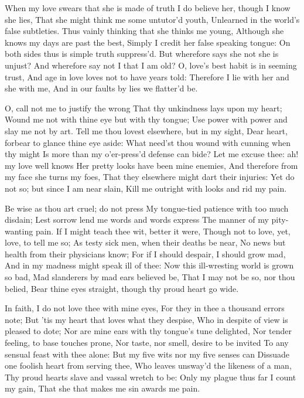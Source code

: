 \documentclass[twocolumn]{book}
\begin{document}
When my love swears that she is made of truth
I do believe her, though I know she lies,
That she might think me some untutor'd youth,
Unlearned in the world's false subtleties.
Thus vainly thinking that she thinks me young,
Although she knows my days are past the best,
Simply I credit her false speaking tongue:
On both sides thus is simple truth suppress'd.
But wherefore says she not she is unjust?
And wherefore say not I that I am old?
O, love's best habit is in seeming trust,
And age in love loves not to have years told:
  Therefore I lie with her and she with me,
  And in our faults by lies we flatter'd be.


O, call not me to justify the wrong
That thy unkindness lays upon my heart;
Wound me not with thine eye but with thy tongue;
Use power with power and slay me not by art.
Tell me thou lovest elsewhere, but in my sight,
Dear heart, forbear to glance thine eye aside:
What need'st thou wound with cunning when thy might
Is more than my o'er-press'd defense can bide?
Let me excuse thee: ah! my love well knows
Her pretty looks have been mine enemies,
And therefore from my face she turns my foes,
That they elsewhere might dart their injuries:
  Yet do not so; but since I am near slain,
  Kill me outright with looks and rid my pain.


Be wise as thou art cruel; do not press
My tongue-tied patience with too much disdain;
Lest sorrow lend me words and words express
The manner of my pity-wanting pain.
If I might teach thee wit, better it were,
Though not to love, yet, love, to tell me so;
As testy sick men, when their deaths be near,
No news but health from their physicians know;
For if I should despair, I should grow mad,
And in my madness might speak ill of thee:
Now this ill-wresting world is grown so bad,
Mad slanderers by mad ears believed be,
  That I may not be so, nor thou belied,
  Bear thine eyes straight, though thy proud heart go wide.


In faith, I do not love thee with mine eyes,
For they in thee a thousand errors note;
But 'tis my heart that loves what they despise,
Who in despite of view is pleased to dote;
Nor are mine ears with thy tongue's tune delighted,
Nor tender feeling, to base touches prone,
Nor taste, nor smell, desire to be invited
To any sensual feast with thee alone:
But my five wits nor my five senses can
Dissuade one foolish heart from serving thee,
Who leaves unsway'd the likeness of a man,
Thy proud hearts slave and vassal wretch to be:
  Only my plague thus far I count my gain,
  That she that makes me sin awards me pain.
\end{document}
